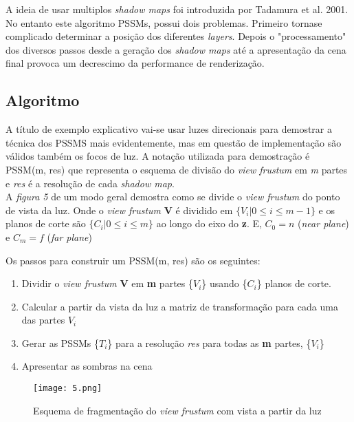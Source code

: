\documentclass[12pt]{article}
\begin{document}
A ideia de usar multiplos {\it shadow maps} foi introduzida por Tadamura et al. 2001. No entanto este algoritmo PSSMs, possui dois problemas. Primeiro tornase complicado determinar a posição dos diferentes {\it layers}. Depois o "processamento" dos diversos passos desde a geração dos {\it shadow maps} até a apresentação da cena final provoca um decrescimo da performance de renderização.

\subsection{Algoritmo}
\vspace{10 mm}
\hspace{7 mm} A título de exemplo explicativo vai-se usar luzes direcionais para demostrar a técnica dos PSSMS mais evidentemente, mas em questão de implementação são válidos também os focos de luz. A notação utilizada para demostração é PSSM(m, res) que representa o esquema de divisão do {\it  view frustum} em {\it m} partes e {\it res} é a resolução de cada {\it shadow map}.\\

A {\it figura 5} de um modo geral demostra como se divide o {\it view frustum} do ponto de vista da luz. Onde o {\it view frustum} \textbf{V} é dividido em 
$\{V_i  |  0 \le i \le m-1 \}$  e os planos de corte são $\{C_i  |  0 \le i \le m\} $ ao longo do eixo do \textbf{z}. E, $C_0 = n$ ({\it near plane}) e $C_m = f$ ({\it far plane})

\vspace{2 mm}
 Os passos para construir um  PSSM(m, res) são os seguintes:
\begin{enumerate}
  \item Dividir o {\it view frustum} \textbf{V} em \textbf{m} partes \{$V_i$\} usando \{$C_i$\} planos de corte.
  \item Calcular a partir da vista da luz a matriz de transformação para cada uma das partes $V_i$
  \item Gerar as PSSMs \{$T_i$\} para a resolução {\it res} para todas as \textbf{m} partes, \{$V_i$\}
  \item Apresentar as sombras na cena
\end{enumerate}

\begin{figure}[!h]
\centering
\texttt{[image: 5.png]}
\caption{Esquema de fragmentação do {\it view frustum} com vista a partir da luz}
\label{img5}
\end{figure}
\end{document}
